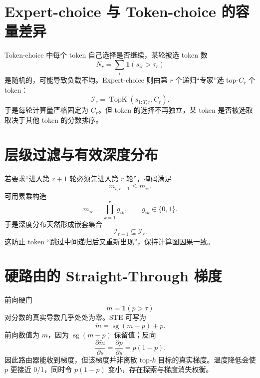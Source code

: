 \documentclass[UTF8,12pt,a4paper,fontset=none]{ctexart}
\numberwithin{equation}{section}
\newcommand{\sg}{\operatorname{sg}}
\begin{document}
\section{Expert-choice 与 Token-choice 的容量差异}
Token-choice 中每个 token 自己选择是否继续，某轮被选 token 数
\begin{equation}
 N_r=\sum_i\mathbf 1(s_{ir}>\tau_r)
\end{equation}
是随机的，可能导致负载不均。Expert-choice 则由第 $r$ 个递归“专家”选 top-$C_r$ 个 token：
\begin{equation}
 \mathcal I_r=\operatorname{TopK}(s_{1:T,r},C_r).
\end{equation}
于是每轮计算量严格固定为 $C_r$。但 token 的选择不再独立，某 token 是否被选取取决于其他 token 的分数排序。

\section{层级过滤与有效深度分布}
若要求“进入第 $r+1$ 轮必须先进入第 $r$ 轮”，掩码满足
\begin{equation}
 m_{i,r+1}\le m_{ir}.
\end{equation}
可用累乘构造
\begin{equation}
 m_{ir}=\prod_{k=1}^{r}g_{ik},\qquad g_{ik}\in\{0,1\}.
\end{equation}
于是深度分布天然形成嵌套集合
\begin{equation}
 \mathcal I_{r+1}\subseteq\mathcal I_r.
\end{equation}
这防止 token “跳过中间递归后又重新出现”，保持计算图因果一致。

\section{硬路由的 Straight-Through 梯度}
前向硬门
\begin{equation}
 m=\mathbf 1(p>\tau)
\end{equation}
对分数的真实导数几乎处处为零。STE 可写为
\begin{equation}
 \widetilde m=\sg(m-p)+p.
\end{equation}
前向数值为 $m$，因为 $\sg(m-p)$ 保留值；反向
\begin{equation}
 \frac{\partial\widetilde m}{\partial s}
 =\frac{\partial p}{\partial s}=p(1-p).
\end{equation}
因此路由器能收到梯度，但该梯度并非离散 top-$k$ 目标的真实梯度。温度降低会使 $p$ 更接近 0/1，同时令 $p(1-p)$ 变小，存在探索与梯度消失权衡。
\end{document}
